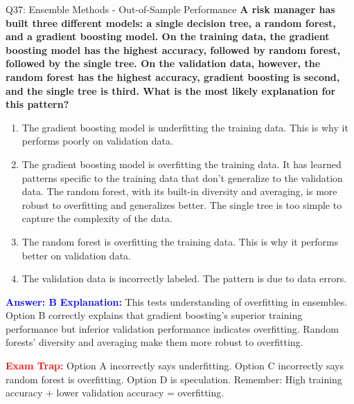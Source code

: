 \documentclass[8pt]{beamer}
\begin{document}
	\begin{frame}{Q37: Ensemble Methods - Out-of-Sample Performance}
		\fontsize{6.5}{7.5}\selectfont
		\textbf{A risk manager has built three different models: a single decision tree, a random forest, and a gradient boosting model. On the training data, the gradient boosting model has the highest accuracy, followed by random forest, followed by the single tree. On the validation data, however, the random forest has the highest accuracy, gradient boosting is second, and the single tree is third. What is the most likely explanation for this pattern?}
		
		\begin{enumerate}
			\item The gradient boosting model is underfitting the training data. This is why it performs poorly on validation data.
			\item The gradient boosting model is overfitting the training data. It has learned patterns specific to the training data that don't generalize to the validation data. The random forest, with its built-in diversity and averaging, is more robust to overfitting and generalizes better. The single tree is too simple to capture the complexity of the data.
			\item The random forest is overfitting the training data. This is why it performs better on validation data.
			\item The validation data is incorrectly labeled. The pattern is due to data errors.
		\end{enumerate}
		
		\vspace{0.1cm}
		\textcolor{blue}{\textbf{Answer: B}}
		\vspace{0.1cm}
		\textcolor{blue}{\textbf{Explanation:}} This tests understanding of overfitting in ensembles. Option B correctly explains that gradient boosting's superior training performance but inferior validation performance indicates overfitting. Random forests' diversity and averaging make them more robust to overfitting.
		
		\textcolor{red}{\textbf{Exam Trap:}} Option A incorrectly says underfitting. Option C incorrectly says random forest is overfitting. Option D is speculation. Remember: High training accuracy + lower validation accuracy = overfitting.
	\end{frame}
	
\end{document}
